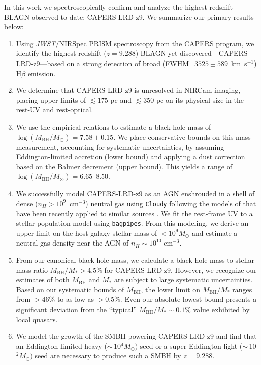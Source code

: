 \documentclass[twocolumn]{aastex7}
\newcommand{\src}{CAPERS-LRD-z9}
\begin{document}
In this work we spectroscopically confirm and analyze the highest redshift BLAGN observed to date: \src{}. We summarize our primary results below:
\begin{enumerate}
\item{Using \textit{JWST}/NIRSpec PRISM spectroscopy from the CAPERS program, we identify the highest redshift ($z=9.288$) BLAGN yet discovered---\src{}---based on a strong detection of broad (FWHM=$3525\pm589$~km~s$^{-1}$) H$\beta$ emission.}
\item{We determine that \src{} is unresolved in NIRCam imaging, placing upper limits of $\lesssim 175$ pc and $\lesssim 350$ pc on its physical size in the rest-UV and rest-optical.}
\item{We use the \citet{greene05} empirical relations to estimate a black hole mass of $\log\left(M_{\textrm{BH}}/M_{\odot}\right)=7.58\pm0.15$. We place conservative bounds on this mass measurement, accounting for systematic uncertainties, by assuming Eddington-limited accretion (lower bound) and applying a dust correction based on the Balmer decrement (upper bound). This yields a range of $\log\left(M_{\textrm{BH}}/M_{\odot}\right)=6.65$--$8.50$.}
\item{We successfully model \src{} as an AGN enshrouded in a shell of dense ($n_H > 10^{9}$~cm$^{-3}$) neutral gas using \texttt{Cloudy} following the models of \citet{inayoshi25} that have been recently applied to similar sources \citep{ji25,naidu25,degraaff25}. We fit the rest-frame UV to a stellar population model using \texttt{bagpipes}. From this modeling, we derive an upper limit on the host galaxy stellar mass of $<10^9M_{\odot}$ and estimate a neutral gas density near the AGN of $n_H \sim 10^{10}$ cm$^{-3}$.}
\item{From our canonical black hole mass, we calculate a black hole mass to stellar mass ratio $M_{\textrm{BH}}/M_*>4.5\%$ for \src{}. However, we recognize our estimates of both $M_\textrm{BH}$ and $M_*$ are subject to large systematic uncertainties.  Based on our systematic bounds of $M_{\textrm{BH}}$, the lower limit on $M_{\textrm{BH}}/M_*$ ranges from $>$46\% to as low as $>$0.5\%. Even our absolute lowest bound presents a significant deviation from the ``typical'' $M_\textrm{BH}/M_*\sim0.1\%$ value exhibited by local quasars.}
\item{We model the growth of the SMBH powering \src{} and find that an Eddington-limited heavy ($\sim$\,10$^{4}M_{\odot})$ seed or a super-Eddington light ($\sim$\,10$^{2}M_{\odot})$ seed are necessary to produce such a SMBH by $z=9.288$.}
\end{enumerate}
\end{document}
